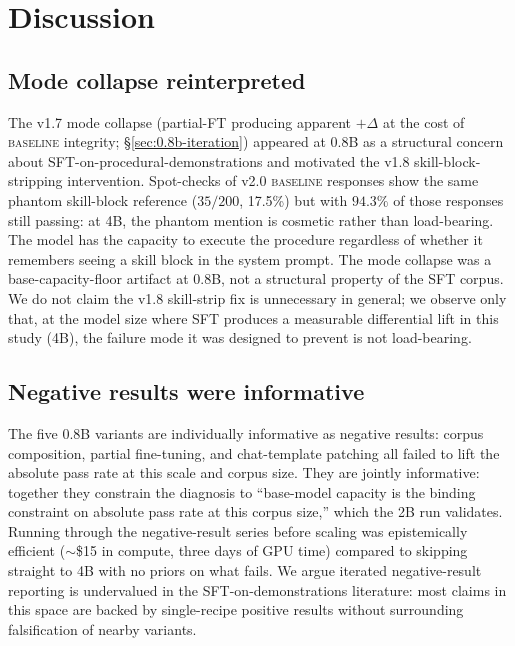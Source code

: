 \documentclass[10pt]{article}
\newcommand{\BL}{\textsc{baseline}\xspace}
\begin{document}
\section{Discussion}

\subsection{Mode collapse reinterpreted}
The v1.7 mode collapse (partial-FT producing apparent $+\Delta$ at the cost of \BL{} integrity; \S\ref{sec:0.8b-iteration}) appeared at 0.8B as a structural concern about SFT-on-procedural-demonstrations and motivated the v1.8 skill-block-stripping intervention. Spot-checks of v2.0 \BL{} responses show the same phantom skill-block reference ($35/200$, 17.5\%) but with $94.3\%$ of those responses still passing: at 4B, the phantom mention is cosmetic rather than load-bearing. The model has the capacity to execute the procedure regardless of whether it remembers seeing a skill block in the system prompt. The mode collapse was a base-capacity-floor artifact at 0.8B, not a structural property of the SFT corpus. We do not claim the v1.8 skill-strip fix is unnecessary in general; we observe only that, at the model size where SFT produces a measurable differential lift in this study (4B), the failure mode it was designed to prevent is not load-bearing.

\subsection{Negative results were informative}
The five 0.8B variants are individually informative as negative results: corpus composition, partial fine-tuning, and chat-template patching all failed to lift the absolute pass rate at this scale and corpus size. They are jointly informative: together they constrain the diagnosis to ``base-model capacity is the binding constraint on absolute pass rate at this corpus size,'' which the 2B run validates. Running through the negative-result series before scaling was epistemically efficient ($\sim$\$15 in compute, three days of GPU time) compared to skipping straight to 4B with no priors on what fails. We argue iterated negative-result reporting is undervalued in the SFT-on-demonstrations literature: most claims in this space are backed by single-recipe positive results without surrounding falsification of nearby variants.
\end{document}
